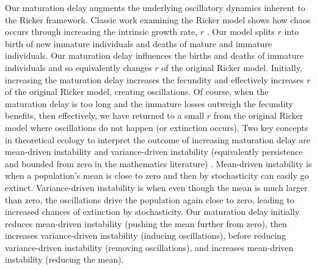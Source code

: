 \documentclass{article}
\numberwithin{theorem}{section}
\begin{document}
{Our maturation delay augments the underlying oscillatory dynamics inherent to the Ricker framework. Classic work examining the Ricker model shows how chaos occurs through increasing the intrinsic growth rate, $r$ \cite{mayBifurcationsDynamicComplexity1976}. Our model splits $r$ into birth of new immature individuals and deaths of mature and immature individuals. Our maturation delay influences the births and deaths of immature individuals and so equivalently changes $r$ of the original Ricker model. Initially, increasing the maturation delay increases the fecundity and effectively increases $r$ of the original Ricker model, creating oscillations. Of course, when the maturation delay is too long and the immature losses outweigh the fecundity benefits, then effectively, we have returned to a small $r$ from the original Ricker model where oscillations do not happen (or extinction occurs). Two key concepts in theoretical ecology to interpret the outcome of increasing maturation delay are mean-driven instability and variance-driven instability (equivalently persistence and bounded from zero in the mathematics literature) \cite{gellner_duality_2016}. Mean-driven instability is when a population's mean is close to zero and then by stochasticity can easily go extinct. Variance-driven instability is when even though the mean is much larger than zero, the oscillations drive the population again close to zero, leading to increased chances of extinction by stochasticity. Our maturation delay initially reduces mean-driven instability (pushing the mean further from zero), then increases variance-driven instability (inducing oscillations), before reducing variance-driven instability (removing oscillations), and increases mean-driven instability (reducing the mean). 

}
\end{document}

